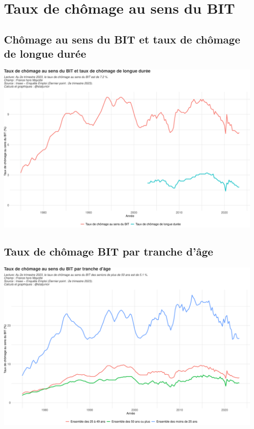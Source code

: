 \documentclass[
  paper=a4,
  ,captions=tableheading
]{scrartcl}
\begin{document}
\newpage

\hypertarget{taux-de-chuxf4mage-au-sens-du-bit}{%
\section{Taux de chômage au sens du
BIT}\label{taux-de-chuxf4mage-au-sens-du-bit}}

\hypertarget{chuxf4mage-au-sens-du-bit-et-taux-de-chuxf4mage-de-longue-duruxe9e}{%
\subsection{Chômage au sens du BIT et taux de chômage de longue
durée}\label{chuxf4mage-au-sens-du-bit-et-taux-de-chuxf4mage-de-longue-duruxe9e}}

\includegraphics{rapport_activite_emploi_chomage_insee_files/figure-latex/unnamed-chunk-17-1.pdf}

\hypertarget{taux-de-chuxf4mage-bit-par-tranche-duxe2ge}{%
\subsection{Taux de chômage BIT par tranche
d'âge}\label{taux-de-chuxf4mage-bit-par-tranche-duxe2ge}}

\includegraphics{rapport_activite_emploi_chomage_insee_files/figure-latex/unnamed-chunk-18-1.pdf}
\end{document}
